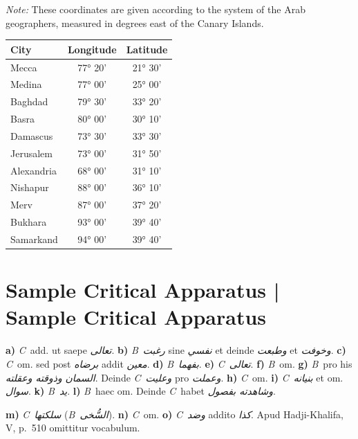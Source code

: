 \documentclass[11pt,a4paper]{article}
\newcommand{\B}{\textit{B}}
\newcommand{\C}{\textit{C}}
\begin{document}
\textit{Note:} These coordinates are given according to the system of the Arab geographers, measured in degrees east of the Canary Islands.

\vspace{0.2cm}

\begin{center}
\begin{longtable}{lcc}
\toprule
\textbf{City} & \textbf{Longitude} & \textbf{Latitude} \\
\midrule
\endhead
Mecca & 77° 20' & 21° 30' \\
Medina & 77° 00' & 25° 00' \\
Baghdad & 79° 30' & 33° 20' \\
Basra & 80° 00' & 30° 10' \\
Damascus & 73° 30' & 33° 30' \\
Jerusalem & 73° 00' & 31° 50' \\
Alexandria & 68° 00' & 31° 10' \\
Nishapur & 88° 00' & 36° 10' \\
Merv & 87° 00' & 37° 20' \\
Bukhara & 93° 00' & 39° 40' \\
Samarkand & 94° 00' & 39° 40' \\
\bottomrule
\end{longtable}
\end{center}

\clearpage


\section{Sample Critical Apparatus | Sample Critical Apparatus}

\begin{footnotesize}
\noindent\textbf{a)} \C\ add. ut saepe \textit{تعالى}. \textbf{b)} \B\ \textit{رغبت} sine \textit{نفسي} et deinde \textit{وطبعت} et \textit{وخوفت}. \textbf{c)} \C\ om. sed post \textit{برضاه} addit \textit{معين}. \textbf{d)} \B\ \textit{بفهما}. \textbf{e)} \C\ \textit{تعالى}. \textbf{f)} \B\ om. \textbf{g)} \B\ pro his \textit{السمان} \textit{وذوقته وعقلته}. Deinde \C\ \textit{وعليت} pro \textit{وعملت}. \textbf{h)} \C\ om. \textbf{i)} \C\ \textit{بنيانه} et om. \textit{سوال}. \textbf{k)} \B\ \textit{يد}. \textbf{l)} \B\ haec om. Deinde \C\ habet \textit{وشاهدته بفصول}.

\vspace{0.2cm}

\noindent\textbf{m)} \C\ \textit{سلكتها} (\B\ \textit{السُّخى}). \textbf{n)} \C\ om. \textbf{o)} \C\ \textit{وضد} addito \textit{كذا}. Apud Hadji-Khalifa, V, p.~510 omittitur vocabulum.
\end{footnotesize}
\end{document}
